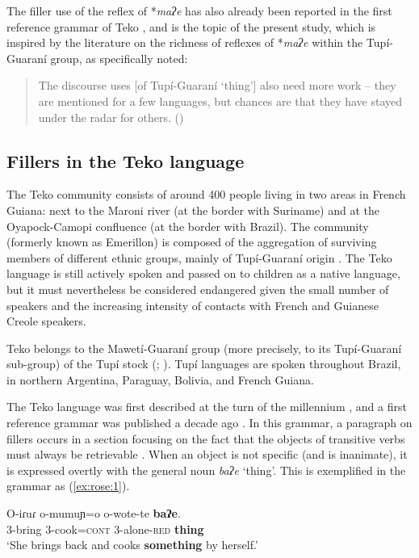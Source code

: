 \documentclass[output=paper]{langscibook}
\begin{document}
The filler use of the reflex of *\textit{maʔe} has also already been reported in the first reference grammar of Teko \citep{Rose2011}, and is the topic of the present study, which is inspired by the literature on the richness of reflexes of *\textit{maʔe} within the Tupí-Guaraní group, as specifically noted:

\begin{quote}
The discourse uses [of Tupí-Guaraní ‘thing’] also need more work – they are mentioned for a few languages, but chances are that they have stayed under the radar for others. (\citealt[90]{AuweraAuwera2021}) 
\end{quote}

\subsection{Fillers in the Teko language}
\label{sec:rose:1.2}
The Teko community consists of around 400 people living in two areas in French Guiana: next to the Maroni river (at the border with Suriname) and at the Oyapock-Camopi confluence (at the border with Brazil). The community (formerly known as Emerillon) is composed  of the aggregation of surviving members of different ethnic groups, mainly of Tupí-Guaraní origin \citep{Navet1994}. The Teko language is still actively spoken and passed on to children as a native language, but it must nevertheless be considered endangered given the small number of speakers and the increasing intensity of contacts with French and Guianese Creole speakers.

Teko belongs to the Mawetí-Guaraní group (more precisely, to its Tupí-Guaraní sub-group) of the Tupí stock (\citealt{Rodrigues1984};  \citealt{roseNodate}). Tupí languages are spoken throughout Brazil, in northern Argentina, Paraguay, Bolivia, and French Guiana. 

The Teko language was first described at the turn of the millennium \citep{Maurel1998}, and a first reference grammar was published a decade ago \citep{Rose2011}. In this grammar, a paragraph on fillers occurs in a section focusing on the fact that the objects of transitive verbs must always be retrievable \citep[176]{Rose2011}. When an object is not specific (and is inanimate), it is expressed overtly with the general noun \textit{baʔe} ‘thing’. This is exemplified in the grammar as (\ref{ex:rose:1}).

\ea \label{ex:rose:1}
\gll O-iɾuɾ  o-mumuɲ=o  o-wote-te  \textbf{baʔe}.\\
3-bring  3-cook=\textsc{cont}  3-alone-\textsc{red}  \textbf{thing}\\
\glt ‘She brings back and cooks \textbf{something} by herself.’ 
\z
\end{document}
